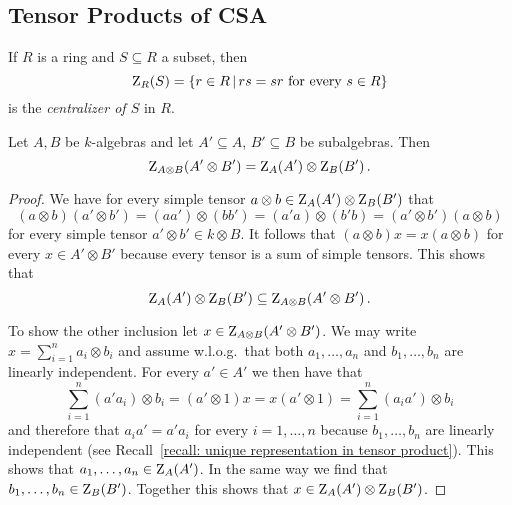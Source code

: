 \subsection{Tensor Products of CSA}


\begin{definition}
  If $R$ is a ring and $S \subseteq R$ a subset, then
  \[
      \centralizer_R(S)
    = \{
        r \in R
      \suchthat
        \text{$rs = sr$ for every $s \in R$}
      \}
  \]
  is the \emph{centralizer of $S$} in $R$.
\end{definition}


\begin{lemma}
  \label{lemma: centralizer componentwise}
  Let $A, B$ be $k$-algebras and let $A' \subseteq A$, $B' \subseteq B$ be subalgebras.
  Then
  \[
      \operatorname{Z}_{A \otimes B}(A' \otimes B')
    = \operatorname{Z}_A(A') \otimes \operatorname{Z}_B(B') \,.
  \]
\end{lemma}


\begin{proof}
  We have for every simple tensor $a \otimes b \in \operatorname{Z}_A(A') \otimes \operatorname{Z}_B(B')$ that
  \[
      (a \otimes b) (a' \otimes b')
    = (aa') \otimes (bb')
    = (a'a) \otimes (b'b)
    = (a' \otimes b')(a \otimes b)
  \]
  for every simple tensor $a' \otimes b' \in k \otimes B$.
  It follows that $(a \otimes b) x = x (a \otimes b)$ for every $x \in A' \otimes B'$ because every tensor is a sum of simple tensors.
  This shows that
  \[
              \operatorname{Z}_A(A') \otimes \operatorname{Z}_B(B')
    \subseteq \operatorname{Z}_{A \otimes B}(A' \otimes B') \,.
  \]
  
  To show the other inclusion let $x \in \operatorname{Z}_{A \otimes B}(A' \otimes B')$.
  We may write $x = \sum_{i=1}^n a_i \otimes b_i$ and assume w.l.o.g.\ that both $a_1, \dotsc, a_n$ and $b_1, \dotsc, b_n$ are linearly independent.
  For every $a' \in A'$ we then have that
  \[
      \sum_{i=1}^n (a' a_i) \otimes b_i
    = (a' \otimes 1) x
    = x (a' \otimes 1)
    = \sum_{i=1}^n (a_i a') \otimes b_i
  \]
  and therefore that $a_i a' = a' a_i$ for every $i = 1, \dotsc, n$ because $b_1, \dotsc, b_n$ are linearly independent (see Recall~\ref{recall: unique representation in tensor product}).
  This shows that $a_1, \dotsc, a_n \in \operatorname{Z}_{A}(A')$.
  In the same way we find that $b_1, \dotsc, b_n \in \operatorname{Z}_{B}(B')$.
  Together this shows that $x \in \operatorname{Z}_A(A') \otimes \operatorname{Z}_B(B')$.
\end{proof}


